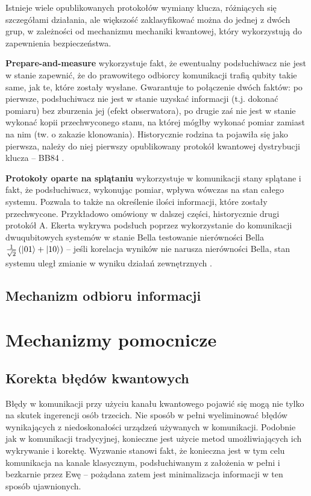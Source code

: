 \documentclass[10pt]{article}
\begin{document}
Istnieje wiele opublikowanych protokołów wymiany klucza, różniących się szczegółami działania, ale
większość zaklasyfikować można do jednej z dwóch grup, w zależności od mechanizmu mechaniki
kwantowej, który wykorzystują do zapewnienia bezpieczeństwa.

\textbf{Prepare-and-measure} wykorzystuje fakt, że ewentualny podsłuchiwacz nie jest w stanie zapewnić,
że do prawowitego odbiorcy komunikacji trafią qubity takie same, jak te, które zostały wysłane.
Gwarantuje to połączenie dwóch faktów: po pierwsze, podsłuchiwacz nie jest w stanie uzyskać informacji
(t.j. dokonać pomiaru) bez zburzenia jej (efekt obserwatora), po drugie zaś nie jest w stanie wykonać
kopii przechwyconego stanu, na której mógłby wykonać pomiar zamiast na nim (tw. o zakazie klonowania).
Historycznie rodzina ta pojawiła się jako pierwsza, należy do niej pierwszy opublikowany protokół
kwantowej dystrybucji klucza -- BB84 \cite{bb84,Scarani09}.

\textbf{Protokoły oparte na splątaniu} wykorzystuje w komunikacji stany splątane i fakt, że 
podsłuchiwacz, wykonując pomiar, wpływa wówczas na stan całego systemu. Pozwala to także na określenie
ilości informacji, które zostały przechwycone. Przykładowo omówiony w dalszej części, historycznie
drugi protokół A. Ekerta wykrywa podsłuch poprzez wykorzystanie do komunikacji dwuqubitowych systemów
w stanie Bella  testowanie nierówności Bella \(\frac{1}{\sqrt{2}}\left(\Ket{01}+\Ket{10}\right)\) 
-- jeśli korelacja wyników nie narusza nierówności Bella, stan systemu uległ zmianie w wyniku działań
zewnętrznych \cite{Ekert91,Ekert12}.

\subsection{Mechanizm odbioru informacji}


\section{Mechanizmy pomocnicze}

\subsection{Korekta błędów kwantowych}

Błędy w komunikacji przy użyciu kanału kwantowego pojawić się mogą nie tylko na skutek ingerencji
osób trzecich. Nie sposób w pełni wyeliminować błędów wynikających z niedoskonałości urządzeń
używanych w komunikacji. Podobnie jak w komunikacji tradycyjnej, konieczne jest użycie metod
umożliwiających ich wykrywanie i korektę. Wyzwanie stanowi fakt, że konieczna jest w tym celu
komunikacja na kanale klasycznym, podsłuchiwanym z założenia w pełni i bezkarnie przez Ewę -- 
pożądana zatem jest minimalizacja informacji w ten sposób ujawnionych.
\end{document}
